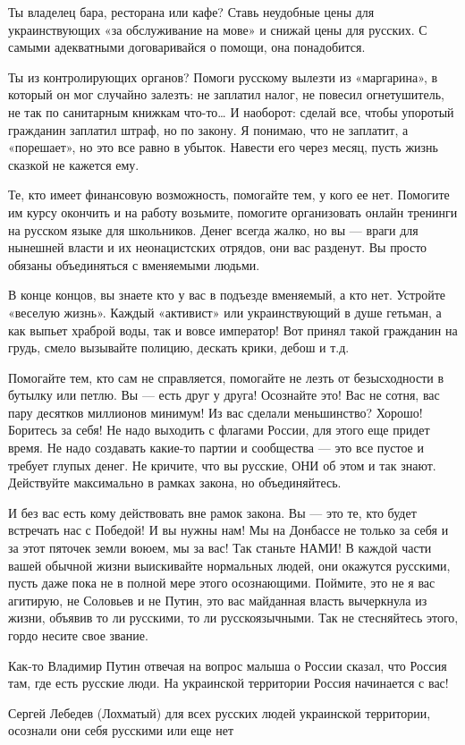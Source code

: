 Ты владелец бара, ресторана или кафе? Ставь неудобные цены для украинствующих
«за обслуживание на мове» и снижай цены для русских. С самыми адекватными
договаривайся о помощи, она понадобится.

Ты из контролирующих органов? Помоги русскому вылезти из «маргарина», в который
он мог случайно залезть: не заплатил налог, не повесил огнетушитель, не так по
санитарным книжкам что-то… И наоборот: сделай все, чтобы упоротый гражданин
заплатил штраф, но по закону. Я понимаю, что не заплатит, а «порешает», но это
все равно в убыток. Навести его через месяц, пусть жизнь сказкой не кажется
ему.

Те, кто имеет финансовую возможность, помогайте тем, у кого ее нет. Помогите им
курсу окончить и на работу возьмите, помогите организовать онлайн тренинги на
русском языке для школьников. Денег всегда жалко, но вы --- враги для нынешней
власти и их неонацистских отрядов, они вас разденут. Вы просто обязаны
объединяться с вменяемыми людьми.

В конце концов, вы знаете кто у вас в подъезде вменяемый, а кто нет. Устройте
«веселую жизнь». Каждый «активист» или украинствующий в душе гетьман, а как
выпьет храброй воды, так и вовсе император! Вот принял такой гражданин на
грудь, смело вызывайте полицию, дескать крики, дебош и т.д.

Помогайте тем, кто сам не справляется, помогайте не лезть от безысходности в
бутылку или петлю. Вы --- есть друг у друга! Осознайте это! Вас не сотня, вас
пару десятков миллионов минимум! Из вас сделали меньшинство? Хорошо! Боритесь
за себя! Не надо выходить с флагами России, для этого еще придет время. Не надо
создавать какие-то партии и сообщества --- это все пустое и требует глупых
денег.  Не кричите, что вы русские, ОНИ об этом и так знают. Действуйте
максимально в рамках закона, но объединяйтесь.

И без вас есть кому действовать вне рамок закона. Вы --- это те, кто будет
встречать нас с Победой! И вы нужны нам! Мы на Донбассе не только за себя и за
этот пяточек земли воюем, мы за вас! Так станьте НАМИ! В каждой части вашей
обычной жизни выискивайте нормальных людей, они окажутся русскими, пусть даже
пока не в полной мере этого осознающими. Поймите, это не я вас агитирую, не
Соловьев и не Путин, это вас майданная власть вычеркнула из жизни, объявив то
ли русскими, то ли русскоязычными. Так не стесняйтесь этого, гордо несите свое
звание.

Как-то Владимир Путин отвечая на вопрос малыша о России сказал, что Россия там,
где есть русские люди. На украинской территории Россия начинается с вас!

Сергей Лебедев (Лохматый) для всех русских людей украинской территории,
осознали они себя русскими или еще нет
  
